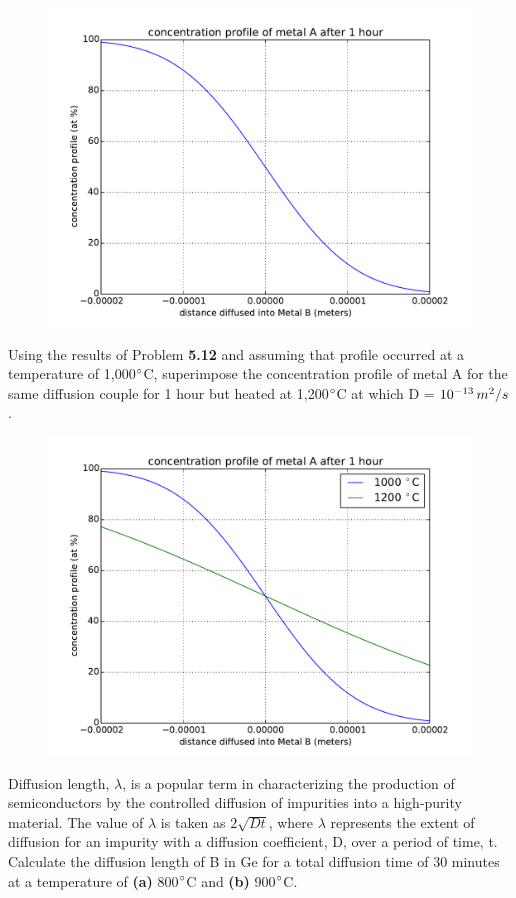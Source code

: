 \documentclass[12pt]{article}
\newenvironment{problem}[2][Problem]{\begin{trivlist}
\item[\hskip \labelsep {\bfseries #1}\hskip \labelsep {\bfseries #2.}]}{\end{trivlist}}
\begin{document}
\begin{figure}[H]
\centering
\includegraphics[width=350pt]{p2_graph.pdf}
\end{figure}

\begin{problem}{5.14}
Using the results of Problem \textbf{5.12} and assuming that profile occurred at a temperature of 1,000$\degree$C, superimpose the concentration profile of metal A for the same diffusion couple for 1 hour but heated at 1,200$\degree$C at which D = $10^{-13} \,m^2/s$.
\end{problem}

\begin{figure}[H]
\centering
\includegraphics[width=350pt]{p3_graph.pdf}
\end{figure}

\begin{problem}{5.24}
Diffusion length, $\lambda$, is a popular term in characterizing the production of semiconductors by the controlled diffusion of impurities into a high-purity material.  The value of $\lambda$ is taken as $2\sqrt{Dt}$, where $\lambda$ represents the extent of diffusion for an impurity with a diffusion coefficient, D, over a period of time, t.  Calculate the diffusion length of B in Ge for a total diffusion time of 30 minutes at a temperature of \textbf{(a)} 800$\degree$C and \textbf{(b)} 900$\degree$C.  
\end{problem}
\end{document}
